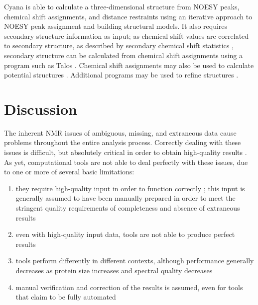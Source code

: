 Cyana is able to calculate a three-dimensional structure from NOESY peaks, 
chemical shift assignments, and distance restraints \cite{cyana2004, aria2003} 
using an iterative approach to NOESY peak assignment and building structural 
models.  It also requires secondary structure information as input; as
chemical shift values are correlated to secondary structure, as described
by secondary chemical shift statistics \cite{spera1991empirical}, secondary 
structure can be calculated from chemical shift assignments using a program 
such as Talos \cite{talos+}.  Chemical shift assignments may also be used to 
calculate potential structures \cite{cs-rosetta}.  Additional programs 
may be used to refine structures \cite{amber, xplor-nih}.



\section{Discussion}

The inherent NMR issues of ambiguous, missing, and extraneous data cause 
problems throughout the entire analysis process.  Correctly dealing with 
these issues is difficult, but absolutely critical in order to obtain 
high-quality results \cite{williamson2009automated, guntert2009automated, 
altieri2004automation, baran2004automated}.  As yet, computational tools 
are not able to deal perfectly with these issues, due to one or more of 
several basic limitations: 
\begin{enumerate}
  \item they require high-quality input in order to function correctly 
  \cite{saga, abacus_assignment, mars, autoassign2001, ezassign, pine, cyana2004}; 
  this input is generally assumed to have been manually prepared in order 
  to meet the stringent quality requirements of completeness and absence of 
  extraneous results
  \item even with high-quality input data, tools are not able to produce 
  perfect results 
  \item tools perform differently in different contexts, although 
  performance generally decreases as protein size increases and spectral quality 
  decreases
  \item manual verification and correction of the results is assumed, 
  even for tools that claim to be fully automated 
  \cite{williamson2009automated, guntert2009automated, altieri2004automation,
  baran2004automated}
\end{enumerate}


